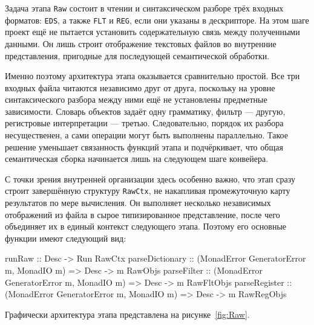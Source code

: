 \documentclass[a4paper,12pt]{article}
\begin{document}
Задача этапа \texttt{Raw} состоит в чтении и синтаксическом разборе трёх входных
форматов: \texttt{EDS}, а также \texttt{FLT} и \texttt{REG}, если они указаны в
дескрипторе. На этом шаге проект ещё не пытается установить содержательную связь между
полученными данными. Он лишь строит отображение текстовых файлов во внутренние
представления, пригодные для последующей семантической обработки.

Именно поэтому архитектура этапа оказывается сравнительно простой. Все три входных
файла читаются независимо друг от друга, поскольку на уровне синтаксического разбора
между ними ещё не установлены предметные зависимости. Словарь объектов задаёт одну
грамматику, фильтр --- другую, регистровые интерпретации --- третью. Следовательно,
порядок их разбора несущественен, а сами операции могут быть выполнены параллельно.
Такое решение уменьшает связанность функций этапа и подчёркивает, что общая
семантическая сборка начинается лишь на следующем шаге конвейера.

С точки зрения внутренней организации здесь особенно важно, что этап сразу строит
завершённую структуру \texttt{RawCtx}, не накапливая промежуточную карту результатов по
мере вычисления. Он выполняет несколько независимых отображений из файла в сырое
типизированное представление, после чего объединяет их в единый контекст следующего
этапа. Поэтому его основные функции имеют следующий вид:

\begin{flushleft}
\label{lst:raw}
\begin{MyCodes}
runRaw :: Desc -> Run RawCtx
parseDictionary :: (MonadError GeneratorError m, MonadIO m) => Desc -> m RawObjs
parseFilter :: (MonadError GeneratorError m, MonadIO m) => Desc -> m RawFltObjs
parseRegister :: (MonadError GeneratorError m, MonadIO m) => Desc -> m RawRegObjs
\end{MyCodes}
\end{flushleft}

Графически архитектура этапа представлена на рисунке~\ref{fig:Raw}.
\end{document}
